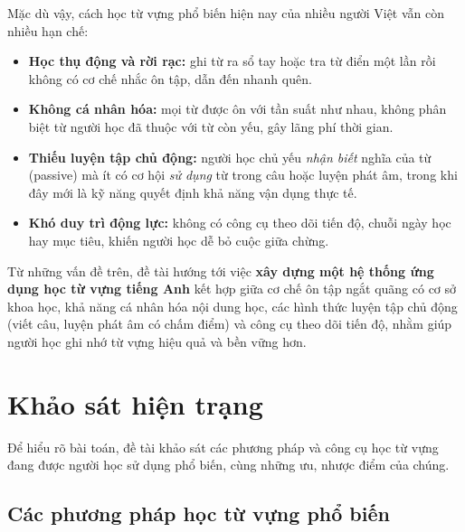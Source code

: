 Mặc dù vậy, cách học từ vựng phổ biến hiện nay của nhiều người Việt vẫn
còn nhiều hạn chế:

\begin{itemize}
  \item \textbf{Học thụ động và rời rạc:} ghi từ ra sổ tay hoặc tra từ
        điển một lần rồi không có cơ chế nhắc ôn tập, dẫn đến nhanh quên.
  \item \textbf{Không cá nhân hóa:} mọi từ được ôn với tần suất như nhau,
        không phân biệt từ người học đã thuộc với từ còn yếu, gây lãng phí
        thời gian.
  \item \textbf{Thiếu luyện tập chủ động:} người học chủ yếu \emph{nhận
        biết} nghĩa của từ (passive) mà ít có cơ hội \emph{sử dụng} từ
        trong câu hoặc luyện phát âm, trong khi đây mới là kỹ năng quyết
        định khả năng vận dụng thực tế.
  \item \textbf{Khó duy trì động lực:} không có công cụ theo dõi tiến độ,
        chuỗi ngày học hay mục tiêu, khiến người học dễ bỏ cuộc giữa chừng.
\end{itemize}

Từ những vấn đề trên, đề tài hướng tới việc \textbf{xây dựng một hệ thống
ứng dụng học từ vựng tiếng Anh} kết hợp giữa cơ chế ôn tập ngắt quãng có
cơ sở khoa học, khả năng cá nhân hóa nội dung học, các hình thức luyện tập
chủ động (viết câu, luyện phát âm có chấm điểm) và công cụ theo dõi tiến độ,
nhằm giúp người học ghi nhớ từ vựng hiệu quả và bền vững hơn.

\section{Khảo sát hiện trạng}
\label{sec:khao-sat-hien-trang}

Để hiểu rõ bài toán, đề tài khảo sát các phương pháp và công cụ học từ
vựng đang được người học sử dụng phổ biến, cùng những ưu, nhược điểm của
chúng.

\subsection{Các phương pháp học từ vựng phổ biến}


